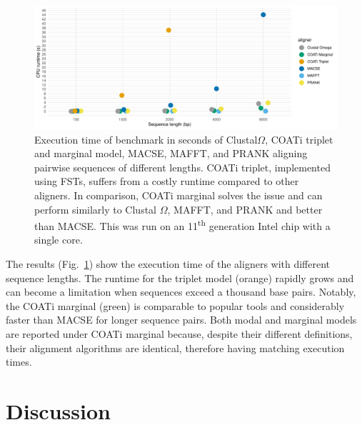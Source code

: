 \begin{figure}[!ht]
    \centering
    \includegraphics[width = \textwidth]{chapter3/figures/results/runtime_aligners.pdf}
    \caption[Runtime Comparison of Aligners]{Execution time of benchmark in seconds of Clustal$\Omega$, COATi triplet and marginal model, MACSE, MAFFT, and PRANK aligning pairwise sequences of different lengths. COATi triplet, implemented using FSTs, suffers from a costly runtime compared to other aligners. In comparison, COATi marginal solves the issue and can perform similarly to Clustal $\Omega$, MAFFT, and PRANK and better than MACSE. This was run on an 11\textsuperscript{th} generation Intel chip with a single core.}
    \label{fig:alns-benchmark}
\end{figure}

The results (Fig.~\ref{fig:alns-benchmark}) show the execution time of the aligners with different sequence lengths. The runtime for the triplet model (orange) rapidly grows and can become a limitation when sequences exceed a thousand base pairs. Notably, the COATi marginal (green) is comparable to popular tools and considerably faster than MACSE for longer sequence pairs. Both modal and marginal models are reported under COATi marginal because, despite their different definitions, their alignment algorithms are identical, therefore having matching execution times.

\section{Discussion}



